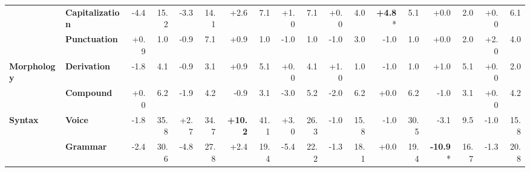 \begin{table}[h]
{\begin{tabular}{llrrrrrrrrrrrrrrrr}
  & \textbf{Capitalization} & \cellcolor{red!8} -4.4 & \cellcolor{blue!12} 15.2 & \cellcolor{red!6} -3.3 & \cellcolor{blue!11} 14.1 & \cellcolor{green!5} +2.6 & \cellcolor{blue!5} 7.1 & \cellcolor{green!1} +1.0 & \cellcolor{blue!5} 7.1 & \cellcolor{red!0} +0.0 & \cellcolor{blue!3} 4.0 & \cellcolor{green!9} \textbf{+4.8}* & \cellcolor{blue!4} 5.1 & \cellcolor{red!0} +0.0 & \cellcolor{blue!1} 2.0 & \cellcolor{red!0} +0.0 & \cellcolor{blue!4} 6.1 \\
  & \textbf{Punctuation} & \cellcolor{green!1} +0.9 & \cellcolor{blue!0} 1.0 & \cellcolor{red!1} -0.9 & \cellcolor{blue!5} 7.1 & \cellcolor{green!1} +0.9 & \cellcolor{blue!0} 1.0 & \cellcolor{red!1} -1.0 & \cellcolor{blue!0} 1.0 & \cellcolor{red!1} -1.0 & \cellcolor{blue!2} 3.0 & \cellcolor{red!1} -1.0 & \cellcolor{blue!0} 1.0 & \cellcolor{red!0} +0.0 & \cellcolor{blue!1} 2.0 & \cellcolor{green!3} +2.0 & \cellcolor{blue!3} 4.0 \\
\midrule
\textbf{Morphology} & \textbf{Derivation} & \cellcolor{red!3} -1.8 & \cellcolor{blue!3} 4.1 & \cellcolor{red!1} -0.9 & \cellcolor{blue!2} 3.1 & \cellcolor{green!1} +0.9 & \cellcolor{blue!4} 5.1 & \cellcolor{red!0} +0.0 & \cellcolor{blue!3} 4.1 & \cellcolor{green!1} +1.0 & \cellcolor{blue!0} 1.0 & \cellcolor{red!1} -1.0 & \cellcolor{blue!0} 1.0 & \cellcolor{green!1} +1.0 & \cellcolor{blue!4} 5.1 & \cellcolor{red!0} +0.0 & \cellcolor{blue!1} 2.0 \\
  & \textbf{Compound} & \cellcolor{red!0} +0.0 & \cellcolor{blue!5} 6.2 & \cellcolor{red!3} -1.9 & \cellcolor{blue!3} 4.2 & \cellcolor{red!1} -0.9 & \cellcolor{blue!2} 3.1 & \cellcolor{red!6} -3.0 & \cellcolor{blue!4} 5.2 & \cellcolor{red!4} -2.0 & \cellcolor{blue!5} 6.2 & \cellcolor{red!0} +0.0 & \cellcolor{blue!5} 6.2 & \cellcolor{red!2} -1.0 & \cellcolor{blue!2} 3.1 & \cellcolor{red!0} +0.0 & \cellcolor{blue!3} 4.2 \\
\midrule
\textbf{Syntax} & \textbf{Voice} & \cellcolor{red!3} -1.8 & \cellcolor{blue!28} 35.8 & \cellcolor{green!5} +2.7 & \cellcolor{blue!27} 34.7 & \cellcolor{green!20} \textbf{+10.2} & \cellcolor{blue!32} 41.1 & \cellcolor{green!6} +3.0 & \cellcolor{blue!21} 26.3 & \cellcolor{red!2} -1.0 & \cellcolor{blue!12} 15.8 & \cellcolor{red!2} -1.0 & \cellcolor{blue!24} 30.5 & \cellcolor{red!6} -3.1 & \cellcolor{blue!7} 9.5 & \cellcolor{red!2} -1.0 & \cellcolor{blue!12} 15.8 \\
  & \textbf{Grammar} & \cellcolor{red!4} -2.4 & \cellcolor{blue!24} 30.6 & \cellcolor{red!9} -4.8 & \cellcolor{blue!22} 27.8 & \cellcolor{green!4} +2.4 & \cellcolor{blue!15} 19.4 & \cellcolor{red!10} -5.4 & \cellcolor{blue!17} 22.2 & \cellcolor{red!2} -1.3 & \cellcolor{blue!14} 18.1 & \cellcolor{red!0} +0.0 & \cellcolor{blue!15} 19.4 & \cellcolor{red!20} \textbf{-10.9}* & \cellcolor{blue!13} 16.7 & \cellcolor{red!2} -1.3 & \cellcolor{blue!16} 20.8 \\

\end{tabular}}
\end{table}
